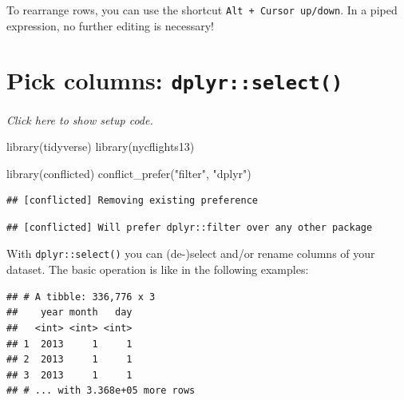 \documentclass[]{book}
\newenvironment{Shaded}{}{}
\newcommand{\KeywordTok}[1]{\textcolor[rgb]{0.00,0.00,1.00}{#1}}
\newcommand{\NormalTok}[1]{#1}
\newcommand{\OperatorTok}[1]{#1}
\newcommand{\StringTok}[1]{\textcolor[rgb]{0.00,0.50,0.50}{#1}}
\begin{document}
To rearrange rows, you can use the shortcut \texttt{Alt\ +\ Cursor\ up/down}.
In a piped expression, no further editing is necessary!

\hypertarget{pick-columns-dplyrselect}{%
\section{\texorpdfstring{Pick columns: \texttt{dplyr::select()}}{Pick columns: dplyr::select()}}\label{pick-columns-dplyrselect}}

\emph{Click here to show setup code.}

\begin{Shaded}
\begin{Highlighting}[]
\KeywordTok{library}\NormalTok{(tidyverse)}
\KeywordTok{library}\NormalTok{(nycflights13)}

\KeywordTok{library}\NormalTok{(conflicted)}
\KeywordTok{conflict_prefer}\NormalTok{(}\StringTok{"filter"}\NormalTok{, }\StringTok{"dplyr"}\NormalTok{)}
\end{Highlighting}
\end{Shaded}

\begin{verbatim}
## [conflicted] Removing existing preference
\end{verbatim}

\begin{verbatim}
## [conflicted] Will prefer dplyr::filter over any other package
\end{verbatim}

With \texttt{dplyr::select()} you can (de-)select and/or rename columns of your dataset.
The basic operation is like in the following examples:

\begin{Shaded}
\end{Shaded}

\begin{verbatim}
## # A tibble: 336,776 x 3
##    year month   day
##   <int> <int> <int>
## 1  2013     1     1
## 2  2013     1     1
## 3  2013     1     1
## # ... with 3.368e+05 more rows
\end{verbatim}

\begin{Shaded}
\end{Shaded}
\end{document}
